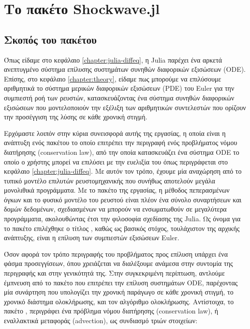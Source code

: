 \chapter{Το πακέτο Shockwave.jl}
\label{chapter:shockwave}

\section{Σκοπός του πακέτου}

Όπως είδαμε στο κεφάλαιο \ref{chapter:julia-diffeq}, η Julia παρέχει ένα αρκετά ανεπτυγμένο σύστημα επίλυσης συστημάτων συνηθών διαφορικών εξισώσεων (ODE).
Επίσης, στο κεφάλαιο \ref{chapter:theory}, είδαμε πως μπορούμε να επιλύσουμε αριθμητικά το σύστημα μερικών διαφορικών εξισώσεων (PDE) του Euler για την συμπιεστή ροή των ρευστών, κατασκευάζοντας ένα σύστημα συνηθών διαφορικών εξισώσεων που μοντελοποιούν την εξέλιξη των αριθμητικών συντελεστών που ορίζουν την προσέγγιση της λύσης σε κάθε χρονική στιγμή.

Ερχόμαστε λοιπόν στην κύρια συνεισφορά αυτής της εργασίας, η οποία είναι η ανάπτυξη ενός πακέτου το οποίο επιτρέπει την περιγραφή ενός προβλήματος νόμου διατήρησης (conservation law), από την οποία κατασκευάζει ένα σύστημα ODE το οποίο ο χρήστης μπορεί να επιλύσει με την ευελιξία του  όπως περιγράφεται στο κεφάλαιο \ref{chapter:julia-diffeq}.
Με αυτόν τον τρόπο, έχουμε μία αναχώρηση από το τυπικό μοντέλο επιλυτών ρευστομηχανικής που συνήθως αποτελούν μεγάλα μονολιθικά προγράμματα.
Με το πακέτο της εργασίας, η μέθοδος πεπερασμένων όγκων και το φυσικό μοντέλο του ρευστού είναι πλέον ένα σύνολο συναρτήσεων και δομών δεδομένων, σχεδιασμένων να μπορούν να ενσωματωθούν σε μεγαλύτερα προγράμματα, ακολουθώντας έτσι την φιλοσοφία σχεδίασης της Julia.
Ως όνομα για το πακέτο επιλέχθηκε ο τίτλος , καθώς ως βασικός στόχος, τουλάχιστον της αρχικής ανάπτυξης, είναι η επίλυση των συμπιεστών εξισώσεων Euler.

Όσον αφορά τον τρόπο περιγραφής του προβλήματος προς επίλυση υπάρχει ένα φάσμα προσεγγίσεων, όπου χρειάζεται να διαλέξουμε ανάμεσα στην συντομία της περιγραφής και στην γενικότητά της.
Στην συγκεκριμένη περίπτωση, αντλούμε έμπνευση από το πακέτο  που επιτρέπει την επίλυση συστημάτων ODE, παρέχοντας μία συνάρτηση που υπολογίζει την χρονική παράγωγο σε κάθε χρονική στιγμή, το χρονικό διάστημα ολοκλήρωσης, και τον αλγόριθμο ολοκλήρωσης.
Αντίστοιχα, το πακέτο , περιγράφει ένα πρόβλημα νόμου διατήρησης (conservation law), ή εναλλακτικά μεταφοράς (advection), ως συνδιασμό τριών στοιχείων:

